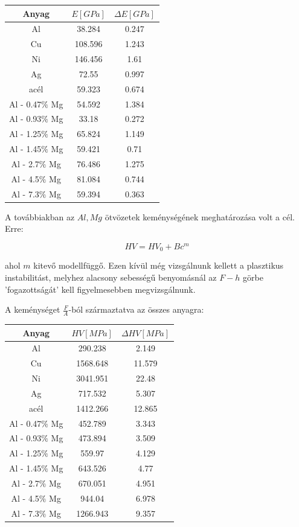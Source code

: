 \documentclass[a4paper,12pt]{article}
\begin{document}
\begin{center}
\begin{tabular}{|c|c|c|}
\hline
Anyag & $E [GPa]$ & $\Delta E [GPa]$ \\
\hline
Al &38.284 &0.247\\
\hline
Cu &108.596 &1.243\\
\hline
Ni &146.456 &1.61\\
\hline
Ag &72.55 &0.997\\
\hline
acél &59.323 &0.674\\
\hline
Al - 0.47$\%$ Mg &54.592& 1.384\\
\hline
Al - 0.93$\%$ Mg &33.18 &0.272\\
\hline
Al - 1.25$\%$ Mg &65.824& 1.149\\
\hline
Al - 1.45$\%$ Mg & 59.421& 0.71\\
\hline
Al - 2.7$\%$ Mg &76.486& 1.275\\
\hline
Al - 4.5$\%$ Mg &81.084& 0.744\\
\hline
Al - 7.3$\%$ Mg &59.394& 0.363\\
\hline
\end{tabular}
\end{center}

\par A továbbiakban az $Al, Mg$ ötvözetek keménységének meghatározása volt a cél. Erre:

\begin{equation*}
HV = HV_{0} + Bc^{m}
\end{equation*}

\par ahol $m$ kitevő modellfüggő. Ezen kívül még vizsgálnunk kellett a plasztikus instabilitást, melyhez alacsony sebességű benyomásnál az $F-h$ görbe 'fogazottságát' kell figyelmesebben megvizsgálnunk. 

\par A keménységet $\frac{F}{A}$-ból származtatva az összes anyagra:

\begin{center}
\begin{tabular}{|c|c|c|}
\hline
Anyag & $HV [MPa]$ & $\Delta HV [MPa]$ \\
\hline
Al & 290.238 & 2.149\\
\hline
Cu & 1568.648 & 11.579\\
\hline
Ni & 3041.951&  22.48\\
\hline
Ag & 717.532 & 5.307\\
\hline
acél & 1412.266 & 12.865\\
\hline
Al - 0.47$\%$ Mg & 452.789&  3.343\\
\hline
Al - 0.93$\%$ Mg & 473.894 & 3.509\\
\hline
Al - 1.25$\%$ Mg & 559.97&  4.129\\
\hline
Al - 1.45$\%$ Mg & 643.526&  4.77\\
\hline
Al - 2.7$\%$ Mg & 670.051 & 4.951\\
\hline
Al - 4.5$\%$ Mg & 944.04 & 6.978\\
\hline
Al - 7.3$\%$ Mg & 1266.943 & 9.357\\
\hline
\end{tabular}
\end{center}
\end{document}
